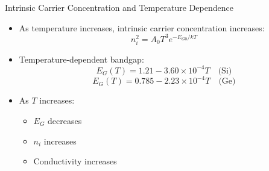 \begin{frame}{Intrinsic Carrier Concentration and Temperature Dependence}
    \begin{itemize}
        \item As temperature increases, intrinsic carrier concentration increases:
        \begin{equation}
        n_i^2 = A_0 T^3 e^{-E_{G0}/kT} \tag{2-18}
        \end{equation}
        \item Temperature-dependent bandgap:
        \begin{equation}
        E_G(T) = 1.21 - 3.60 \times 10^{-4}T \quad \text{(Si)} \tag{2-19}
        \end{equation}
        \begin{equation}
        E_G(T) = 0.785 - 2.23 \times 10^{-4}T \quad \text{(Ge)} \tag{2-20}
        \end{equation}
        \item As $T$ increases:
        \begin{itemize}
            \item $E_G$ decreases
            \item $n_i$ increases
            \item Conductivity increases
        \end{itemize}
    \end{itemize}
\end{frame}

